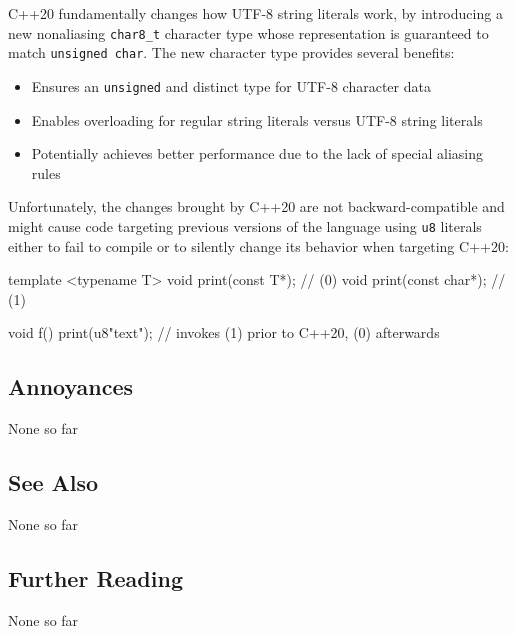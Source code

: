 C++20
fundamentally changes how UTF-8 string literals work, by introducing a
new nonaliasing \lstinline!char8_t! character type whose representation
is guaranteed to match \lstinline!unsigned!~\lstinline!char!. The new
character type provides several benefits:
\begin{itemize}
\item{Ensures an \lstinline!unsigned! and distinct type for UTF-8 character data}
\item{Enables overloading for regular string literals versus UTF-8 string literals}
\item{Potentially achieves better performance due to the lack of special aliasing rules}
\end{itemize}
Unfortunately, the changes brought by C++20 are not
backward-compatible and might cause code targeting previous versions
of the language using \lstinline!u8! literals either to fail to compile
or to silently change its behavior when targeting C++20:

\begin{emcppslisting}[language=C++]
template <typename T> void print(const T*);  // (0)
void print(const char*);                     // (1)

void f()
{
    print(u8"text");  // invokes (1) prior to C++20, (0) afterwards
}
\end{emcppslisting}
        

\subsection[Annoyances]{Annoyances}\label{annoyances}

None so far

\subsection[See Also]{See Also}\label{see-also}

None so far

\subsection[Further Reading]{Further Reading}\label{further-reading}

None so far

